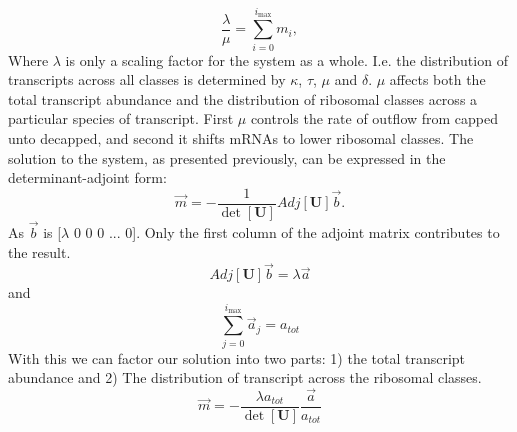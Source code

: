 \documentclass[review]{elsarticle}
\newcommand{\imax}{\ensuremath{i_{\max}}\xspace}
\let\bs\boldsymbol
\begin{document}
	\begin{equation}\label{eq:eq_capped_sum}
		\frac{\lambda}{\mu}=\sum_{i=0}^{\imax}m_{i},
	\end{equation}
Where $\lambda$ is only a scaling factor for the system as a whole. I.e. the distribution of transcripts across all classes is determined by $\kappa$, $\tau$, $\mu$ and $\delta$. %
$\mu$ affects both the total transcript abundance and the distribution of ribosomal classes across a particular species of transcript.
First $\mu$ controls the rate of outflow from capped unto decapped, and second it shifts mRNAs to lower ribosomal classes.
The solution to the system, as presented previously, can be expressed in the determinant-adjoint form:
	\begin{equation*}
		\vec{m}=-\frac{1}{\det[\bs{U}]}Adj[\bs{U}]\vec{b}.
	\end{equation*}
As $\vec{b}$ is [$\lambda$ 0 0 0 ... 0]. Only the first column of the adjoint matrix contributes to the result. 
	\begin{equation*}
		Adj[\bs{U}]\vec{b} = \lambda\vec{a}
	\end{equation*}	
and
	\begin{equation*}
		\sum_{j=0}^{\imax}\vec{a}_j = a_{tot} 
	\end{equation*}
With this we can factor our solution into two parts: 1) the total transcript abundance and 2) The distribution of transcript across the ribosomal classes.
	\begin{equation*}
		\vec{m}=-\frac{\lambda a_{tot}}{\det[\bs{U}]} \frac{\vec{a}}{a_{tot}} 
	\end{equation*}
\end{document}
